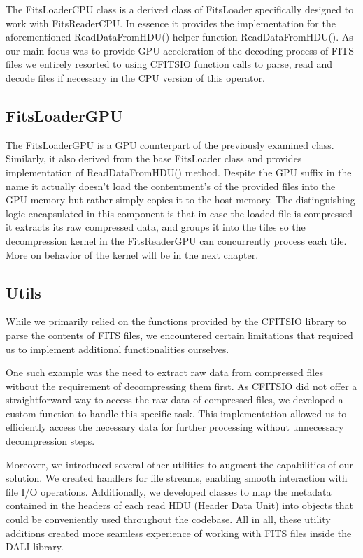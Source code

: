\documentclass[licencjacka,en]{pracamgr}
\begin{document}
The FitsLoaderCPU class is a derived class of FitsLoader specifically designed to work with FitsReaderCPU. In essence it provides the implementation for the aforementioned ReadDataFromHDU() helper function ReadDataFromHDU(). As our main focus was to provide GPU acceleration 
of the decoding process of FITS files we entirely resorted to using 
CFITSIO function calls to parse, read and decode files if necessary in the CPU version of this operator.  

\subsection{FitsLoaderGPU}
The FitsLoaderGPU is a  GPU counterpart of the previously examined class. Similarly, it also
derived from the base FitsLoader class and provides implementation of ReadDataFromHDU() method. Despite the GPU suffix in the name it actually doesn't load the contentment's of 
the provided files into the GPU memory but rather simply copies it to the host memory. 
The distinguishing logic encapsulated in this component is that in case the loaded file 
is compressed it extracts its raw compressed data, and groups it into the tiles so the decompression kernel in the FitsReaderGPU can concurrently process each tile. More on 
behavior of the kernel will be in the next chapter. 

\subsection{Utils}

While we primarily relied on the functions provided by the CFITSIO library to parse the contents of FITS files, we encountered certain limitations that required us to implement additional functionalities ourselves.

One such example was the need to extract raw data from compressed files without the requirement of decompressing them first. As CFITSIO did not offer a straightforward way to access the raw data of compressed files, we developed a custom function to handle this specific task. This implementation allowed us to efficiently access the necessary data for further processing without unnecessary decompression steps.

Moreover, we introduced several other utilities to augment the capabilities of our solution. We created handlers for file streams, enabling smooth interaction with file I/O operations. Additionally, we developed classes to map the metadata contained in the headers of each read HDU (Header Data Unit) into objects that could be conveniently used throughout the codebase. All in all, these utility additions created more seamless experience of working with FITS files inside the DALI library.
\end{document}
